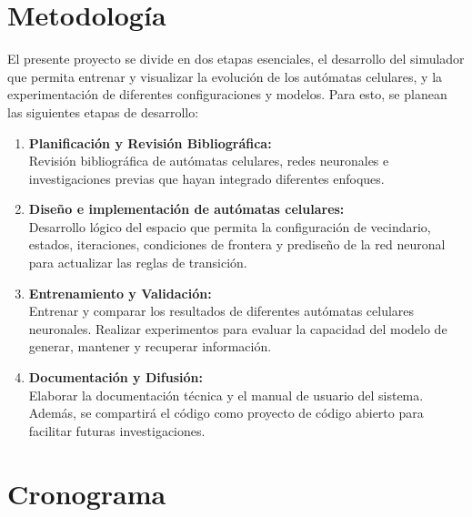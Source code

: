 \documentclass[letterpaper,10pt,oneside]{article}
\begin{document}
	\section{Metodología}
	
	El presente proyecto se divide en dos etapas esenciales, el desarrollo del simulador que permita entrenar y visualizar la evolución de los autómatas celulares, y la experimentación de diferentes configuraciones y modelos. Para esto, se planean las siguientes etapas de desarrollo:
	
	\begin{enumerate}
		\item \textbf{Planificación y Revisión Bibliográfica:} \\
		Revisión bibliográfica de autómatas celulares, redes neuronales e investigaciones previas que hayan integrado diferentes enfoques.
		
		\item \textbf{Diseño e implementación de autómatas celulares:} \\
		Desarrollo lógico del espacio que permita la configuración de vecindario, estados, iteraciones, condiciones de frontera y prediseño de la red neuronal para actualizar las reglas de transición.
		
		\item \textbf{Entrenamiento y Validación:} \\
		Entrenar y comparar los resultados de diferentes autómatas celulares neuronales. Realizar experimentos para evaluar la capacidad del modelo de generar, mantener y recuperar información.
		
		\item \textbf{Documentación y Difusión:} \\
		Elaborar la documentación técnica y el manual de usuario del sistema. Además, se compartirá el código como proyecto de código abierto para facilitar futuras investigaciones.
	\end{enumerate}
	
	\section{Cronograma}
	
\end{document}
